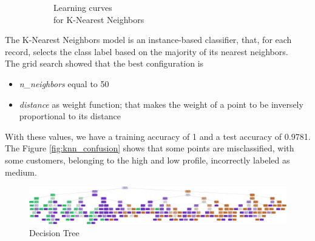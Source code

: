 \begin{figure}[h!]
\begin{subfigure}{0.49\textwidth}
         \caption{Learning curves \\ for K-Nearest Neighbors}
         \label{fig:knn_lc}
     \end{subfigure}
     \caption{}
    \label{fig:knn}
\end{figure}

The K-Nearest Neighbors model is an instance-based classifier, that, for each record, selects the class label based on the majority of its nearest neighbors.\\
The grid search showed that the best configuration is
\begin{itemize}
\item \emph{n\_neighbors} equal to 50
\item \emph{distance} as weight function; that makes the weight of a point to be inversely proportional to its distance
\end{itemize}

With these values, we have a training accuracy of 1 and a test accuracy of 0.9781.
The Figure \ref{fig:knn_confusion} shows that some points are misclassified, with some customers, belonging to the high and low profile, incorrectly labeled as medium.

\begin{figure}
\centering
\includegraphics[width=\linewidth]{img/classification/decision_tree.png}
\caption{Decision Tree}
\label{fig:decision_tree}
\end{figure}

